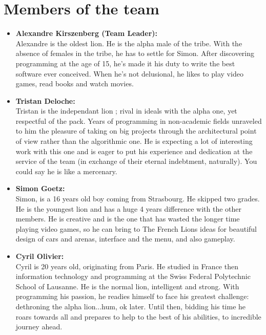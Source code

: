 \section{Members of the team}

\begin{itemize}
    \item\textbf{Alexandre Kirszenberg (Team Leader):}{\\
    Alexandre is the oldest lion. He is the alpha male of the tribe. With the absence of females in the tribe, he has to settle for Simon. After discovering programming at the age of 15, he’s made it his duty to write the best software ever conceived. When he’s not delusional, he likes to play video games, read books and watch movies.}\\

    \item\textbf{Tristan Deloche:}{\\
    Tristan is the independant lion ; rival in ideals with the alpha one, yet respectful of the pack. Years of programming in non-academic fields unraveled to him the pleasure of taking on big projects through the architectural point of view rather than the algorithmic one. He is expecting a lot of interesting work with this one and is eager to put his experience and dedication at the service of the team (in exchange of their eternal indebtment, naturally). You could say he is like a mercenary.}\\

    \item\textbf{Simon Goetz:}{\\
    Simon, is a 16 years old boy coming from Strasbourg. He skipped two grades. He is the youngest lion and has a huge 4 years difference with the other members. He is creative and is the one that has wasted the longer time playing video games, so he can bring to The French Lions ideas for beautiful design of cars and arenas, interface and the menu, and also gameplay.}\\

    \item\textbf{Cyril Olivier:}{\\
    Cyril is 20 years old, originating from Paris. He studied in France then information technology and programming at the Swiss Federal Polytechnic School of Lausanne. He is the normal lion, intelligent and strong. With programming his passion, he readies himself to face his greatest challenge: dethroning the alpha lion...hum, ok later. Until then, bidding his time he roars towards all and prepares to help to the best of his abilities, to incredible journey ahead.}\\
    
\end{itemize}

